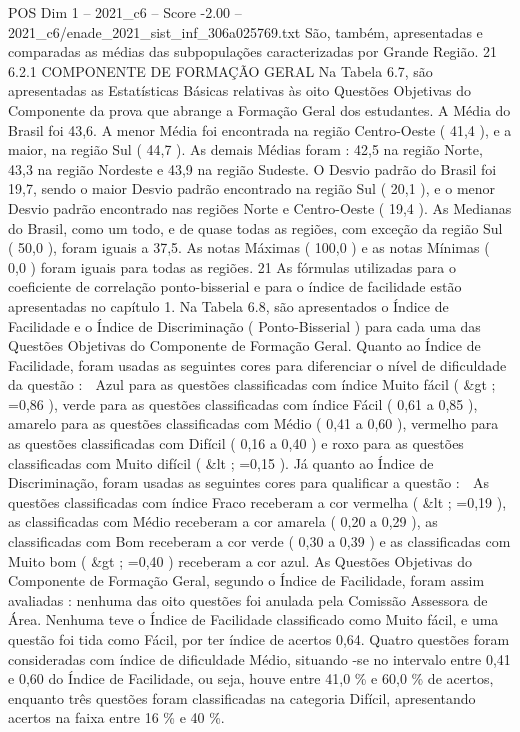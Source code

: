 \begin{textsample}{POS Dim 1 – 2021\_c6 – Score -2.00 – 2021\_c6/enade\_2021\_sist\_inf\_306a025769.txt}
São, também, apresentadas e comparadas as médias das subpopulações caracterizadas por Grande Região. 21 6.2.1 COMPONENTE DE FORMAÇÃO GERAL Na Tabela 6.7, são apresentadas as Estatísticas Básicas relativas às oito Questões Objetivas do Componente da prova que abrange a Formação Geral dos estudantes.
A Média do Brasil foi 43,6.
A menor Média foi encontrada na região Centro-Oeste ( 41,4 ), e a maior, na região Sul ( 44,7 ).
As demais Médias foram : 42,5 na região Norte, 43,3 na região Nordeste e 43,9 na região Sudeste.
O Desvio padrão do Brasil foi 19,7, sendo o maior Desvio padrão encontrado na região Sul ( 20,1 ), e o menor Desvio padrão encontrado nas regiões Norte e Centro-Oeste ( 19,4 ).
As Medianas do Brasil, como um todo, e de quase todas as regiões, com exceção da região Sul ( 50,0 ), foram iguais a 37,5.
As notas Máximas ( 100,0 ) e as notas Mínimas ( 0,0 ) foram iguais para todas as regiões. 21 As fórmulas utilizadas para o coeficiente de correlação ponto-bisserial e para o índice de facilidade estão apresentadas no capítulo 1.
Na Tabela 6.8, são apresentados o Índice de Facilidade e o Índice de Discriminação ( Ponto-Bisserial ) para cada uma das Questões Objetivas do Componente de Formação Geral.
Quanto ao Índice de Facilidade, foram usadas as seguintes cores para diferenciar o nível de dificuldade da questão :  Azul para as questões classificadas com índice Muito fácil ( \&gt ; =0,86 ), verde para as questões classificadas com índice Fácil ( 0,61 a 0,85 ), amarelo para as questões classificadas com Médio ( 0,41 a 0,60 ), vermelho para as questões classificadas com Difícil ( 0,16 a 0,40 ) e roxo para as questões classificadas com Muito difícil ( \&lt ; =0,15 ).
Já quanto ao Índice de Discriminação, foram usadas as seguintes cores para qualificar a questão :  As questões classificadas com índice Fraco receberam a cor vermelha ( \&lt ; =0,19 ), as classificadas com Médio receberam a cor amarela ( 0,20 a 0,29 ), as classificadas com Bom receberam a cor verde ( 0,30 a 0,39 ) e as classificadas com Muito bom ( \&gt ; =0,40 ) receberam a cor azul.
As Questões Objetivas do Componente de Formação Geral, segundo o Índice de Facilidade, foram assim avaliadas : nenhuma das oito questões foi anulada pela Comissão Assessora de Área.
Nenhuma teve o Índice de Facilidade classificado como Muito fácil, e uma questão foi tida como Fácil, por ter índice de acertos 0,64.
Quatro questões foram consideradas com índice de dificuldade Médio, situando -se no intervalo entre 0,41 e 0,60 do Índice de Facilidade, ou seja, houve entre 41,0 \% e 60,0 \% de acertos, enquanto três questões foram classificadas na categoria Difícil, apresentando acertos na faixa entre 16 \% e 40 \%.

\end{textsample}
